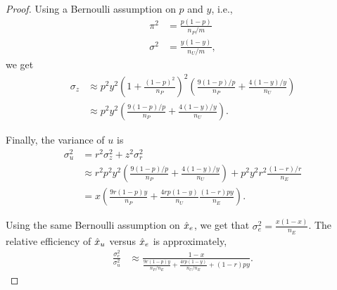 \begin{proof}
  Using a Bernoulli assumption on $p$ and $y$, i.e., 
  \begin{align*}
    \pi^2 &= \frac{p (1-p)}{n_P/m} \\
    \sigma^2 &= \frac{y (1-y)}{n_U/m},
  \end{align*}
  we get
  \begin{align*}
    \sigma_z &\approx 
        p^2 y^2
        {\left(1 + \frac{{(1-p)}^2}{n_P} \right)}^2
        \left(
        \frac{9 (1-p)/p}{n_P}  +
        \frac{4 (1-y)/y}{n_U}
          \right) \\
        &\approx
        p^2 y^2
        \left(
        \frac{9 (1-p)/p}{n_P}  +
        \frac{4 (1-y)/y}{n_U}
          \right).
  \end{align*}

  Finally, the variance of $u$ is 
  \begin{align*}
  \sigma_u^2 &= r^2 \sigma_z^2 + z^2 \sigma_r^2 \\
        &\approx r^2 p^2 y^2
        \left(
        \frac{9 (1-p)/p}{n_P}  +
        \frac{4 (1-y)/y}{n_U}
          \right) +
          p^2 y^2 r^2 \frac{(1-r)/r}{n_E} \\
        &= x
        \left(
        \frac{9 r(1-p)y}{n_P}  +
        \frac{4 rp(1-y)}{n_U}
          \frac{(1-r)py}{n_E}
          \right).
  \end{align*}

  Using the same Bernoulli assumption on $\hat{x}_e$, we get that $\sigma^2_e = \frac{x (1-x)}{n_E}$.
  The relative efficiency of $\hat{x}_u$ versus $\hat{x}_e$ is approximately,
  \begin{align*}
    \frac{\sigma_e^2}{\sigma_u^2}
    &\approx \frac{1-x
      }{
        \frac{9 r(1-p)y}{n_P/n_E}  +
        \frac{4 rp(1-y)}{n_U/n_E} +
          (1-r)py
        }.
  \end{align*}
\end{proof}

